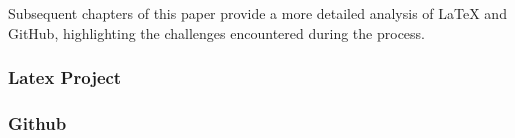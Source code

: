     Subsequent chapters of this paper provide a more detailed analysis of LaTeX and GitHub, highlighting the challenges encountered during the process.
\subsubsection{Latex Project}

\subsubsection{Github}









